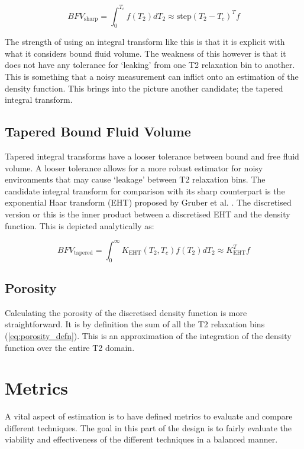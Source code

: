 \begin{equation}
    \label{eq:sharpBFVIntegral}
    BFV_{\text{sharp}} = \int^{T_c}_{0} f(T_2) d T_2 \approx \text{step}(T_2 - T_c)^T f
\end{equation}

The strength of using an integral transform like this is that it is explicit with what it considers bound fluid volume. The weakness of this however is that it does not have any tolerance for `leaking' from one T2 relaxation bin to another. This is something that a noisy measurement can inflict onto an estimation of the density function. This brings into the picture another candidate; the tapered integral transform.


\subsection{Tapered Bound Fluid Volume}
Tapered integral transforms have a looser tolerance between bound and free fluid volume. A looser tolerance allows for a more robust estimator for noisy environments that may cause `leakage' between T2 relaxation bins. The candidate integral transform for comparison with its sharp counterpart is the exponential Haar transform (EHT) proposed by Gruber et al. \cite{GruberLinearFunctionals2013}. The discretised version or this is the inner product between a discretised EHT and the density function. This is depicted analytically as:

\begin{equation}
    \label{eq:taperedBFVIntegral}
    BFV_{\text{tapered}} = \int^{\infty}_{0} K_{\text{EHT}}(T_2,T_c) f(T_2) dT_2 \approx  K_{\text{EHT}}^T f
\end{equation}


\subsection{Porosity}
Calculating the porosity of the discretised density function is more straightforward. It is by definition the sum of all the T2 relaxation bins (\ref{eq:porosity_defn}). This is an approximation of the integration of the density function over the entire T2 domain.

\section{Metrics}
A vital aspect of estimation is to have defined metrics to evaluate and compare different techniques. The goal in this part of the design is to fairly evaluate the viability and effectiveness of the different techniques in a balanced manner.


